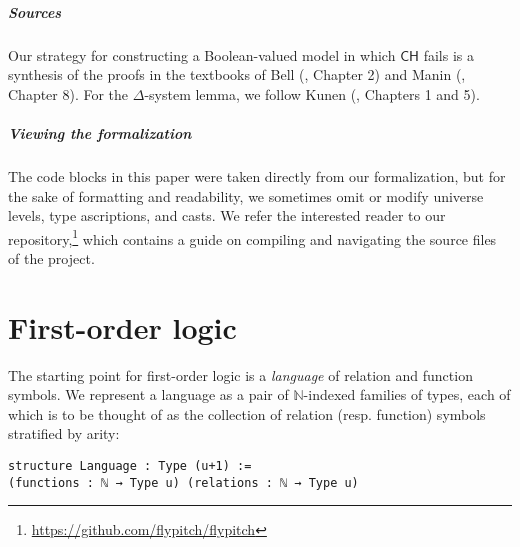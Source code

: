 \documentclass[a4paper,USenglish,cleveref, autoref]{lipics-v2019}
\newcommand{\B}{\mathbb{B}}
\newcommand{\N}{\mathbb{N}}
\theoremstyle{theorem}
\theoremstyle{definition}
\begin{document}
\subparagraph*{Sources} Our strategy for constructing a Boolean-valued model in which $\mathsf{CH}$ fails is a synthesis of the proofs in the textbooks of Bell (\cite{bell2011set}, Chapter 2) and Manin (\cite{manin2009course}, Chapter 8). For the $\Delta$-system lemma, we follow Kunen (\cite{kunen2014set}, Chapters 1 and 5).

\subparagraph*{Viewing the formalization}
The code blocks in this paper were taken directly from our formalization, but for the sake of formatting and readability, we sometimes omit or modify universe levels, type ascriptions, and casts. We refer the interested reader to our repository,\footnote{\url{https://github.com/flypitch/flypitch}} which contains a guide on compiling and navigating the source files of the project.

\section{First-order logic}
\label{sect:fol}
The starting point for first-order logic is a \emph{language} of relation and function symbols. We represent a language as a pair of $\N$-indexed families of types, each of which is to be thought of as the collection of relation (resp. function) symbols stratified by arity:
\begin{lstlisting}
structure Language : Type (u+1) :=
(functions : ℕ → Type u) (relations : ℕ → Type u)
\end{lstlisting}
\end{document}
